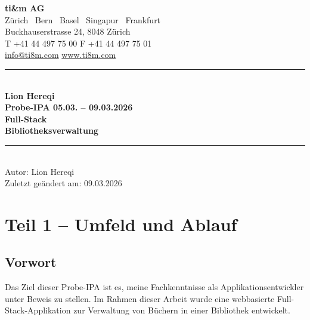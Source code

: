 \documentclass[a4paper,12pt,twoside]{report}
\begin{document}
\begin{titlepage}
    \centering
    \vspace*{1cm}

    {\Large\bfseries ti\&m AG}\\[0.3cm]
    {\small Zürich \textbar\ Bern \textbar\ Basel \textbar\ Singapur \textbar\ Frankfurt}\\[0.2cm]
    {\small Buckhauserstrasse 24, 8048 Zürich}\\[0.2cm]
    {\small T +41 44 497 75 00 \quad F +41 44 497 75 01}\\[0.2cm]
    {\small \href{mailto:info@ti8m.com}{info@ti8m.com} \quad \href{https://www.ti8m.com}{www.ti8m.com}}\\[2cm]

    \rule{\textwidth}{1pt}\\[1.5cm]

    {\Huge\bfseries\color{timsecondary} Lion Hereqi}\\[0.5cm]
    {\LARGE\bfseries Probe-IPA 05.03. -- 09.03.2026}\\[1.5cm]

    {\huge\bfseries\color{timprimary} Full-Stack\\Bibliotheksverwaltung}\\[2cm]

    \rule{\textwidth}{1pt}\\[1cm]

    {\large Autor: Lion Hereqi}\\[0.3cm]
    {\large Zuletzt geändert am: 09.03.2026}\\

    \vfill
\end{titlepage}

\tableofcontents
\newpage

\chapter{Teil 1 -- Umfeld und Ablauf}

\section{Vorwort}
Das Ziel dieser Probe-IPA ist es, meine Fachkenntnisse als Applikationsentwickler unter Beweis zu stellen. Im Rahmen dieser Arbeit wurde eine webbasierte Full-Stack-Applikation zur Verwaltung von Büchern in einer Bibliothek entwickelt.
\end{document}
